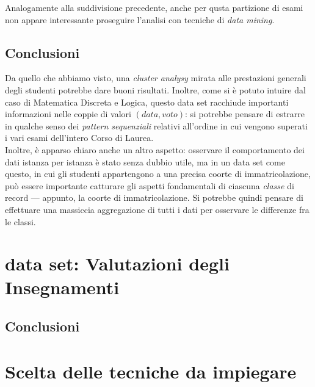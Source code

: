 Analogamente alla suddivisione precedente, anche per qusta partizione di esami non appare interessante proseguire l'analisi con tecniche di \textit{data mining}.

\subsection{Conclusioni}

Da quello che abbiamo visto, una \textit{cluster analysy} mirata alle prestazioni generali degli studenti potrebbe dare buoni risultati. Inoltre, come si è potuto intuire dal caso di Matematica Discreta e Logica, questo data set racchiude importanti informazioni nelle coppie di valori $(data, voto)$: si potrebbe pensare di estrarre in qualche senso dei \textit{pattern sequenziali} relativi all'ordine in cui vengono superati i vari esami dell'intero Corso di Laurea. \\

Inoltre, è apparso chiaro anche un altro aspetto: osservare il comportamento dei dati istanza per istanza è stato senza dubbio utile, ma in un data set come questo, in cui gli studenti appartengono a una precisa coorte di immatricolazione, può essere importante catturare gli aspetti fondamentali di ciascuna \textit{classe} di record --- appunto, la coorte di immatricolazione. Si potrebbe quindi pensare di effettuare una massiccia aggregazione di tutti i dati per osservare le differenze fra le classi.

\section{data set: Valutazioni degli Insegnamenti}

\subsection{Conclusioni}

\section{Scelta delle tecniche da impiegare}